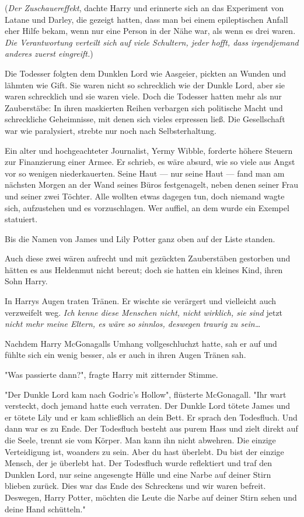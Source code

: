 {(\emph{Der Zuschauereffekt}, dachte Harry und erinnerte sich an das Experiment von Latane und Darley, die gezeigt hatten, dass man bei einem epileptischen Anfall eher Hilfe bekam, wenn nur eine Person in der Nähe war, als wenn es drei waren. \emph{Die Verantwortung verteilt sich auf viele Schultern, jeder hofft, dass irgendjemand anderes zuerst eingreift.})

Die Todesser folgten dem Dunklen Lord wie Aasgeier, pickten an Wunden und lähmten wie Gift. Sie waren nicht so schrecklich wie der Dunkle Lord, aber sie waren schrecklich und sie waren viele. Doch die Todesser hatten mehr als nur Zauberstäbe: In ihren maskierten Reihen verbargen sich politische Macht und schreckliche Geheimnisse, mit denen sich vieles erpressen ließ. Die Gesellschaft war wie paralysiert, strebte nur noch nach Selbsterhaltung.

Ein alter und hochgeachteter Journalist, Yermy Wibble, forderte höhere Steuern zur Finanzierung einer Armee. Er schrieb, es wäre absurd, wie so viele aus Angst vor so wenigen niederkauerten. Seine Haut --- nur seine Haut --- fand man am nächsten Morgen an der Wand seines Büros festgenagelt, neben denen seiner Frau und seiner zwei Töchter. Alle wollten etwas dagegen tun, doch niemand wagte sich, aufzustehen und es vorzuschlagen. Wer auffiel, an dem wurde ein Exempel statuiert.

Bis die Namen von James und Lily Potter ganz oben auf der Liste standen.

Auch diese zwei wären aufrecht und mit gezückten Zauberstäben gestorben und hätten es aus Heldenmut nicht bereut; doch sie hatten ein kleines Kind, ihren Sohn Harry.

In Harrys Augen traten Tränen. Er wischte sie verärgert und vielleicht auch verzweifelt weg. \emph{Ich kenne diese Menschen nicht, nicht wirklich, sie sind} jetzt \emph{nicht mehr meine Eltern, es wäre so sinnlos, deswegen traurig zu sein…}

Nachdem Harry McGonagalls Umhang vollgeschluchzt hatte, sah er auf und fühlte sich ein wenig besser, als er auch in ihren Augen Tränen sah.

"Was passierte dann?", fragte Harry mit zitternder Stimme.

"Der Dunkle Lord kam nach Godric's Hollow", flüsterte McGonagall. "Ihr wart versteckt, doch jemand hatte euch verraten. Der Dunkle Lord tötete James und er tötete Lily und er kam schließlich an dein Bett. Er sprach den Todesfluch. Und dann war es zu Ende. Der Todesfluch besteht aus purem Hass und zielt direkt auf die Seele, trennt sie vom Körper. Man kann ihn nicht abwehren. Die einzige Verteidigung ist, woanders zu sein. Aber du hast überlebt. Du bist der einzige Mensch, der je überlebt hat. Der Todesfluch wurde reflektiert und traf den Dunklen Lord, nur seine angesengte Hülle und eine Narbe auf deiner Stirn blieben zurück. Dies war das Ende des Schreckens und wir waren befreit. Deswegen, Harry Potter, möchten die Leute die Narbe auf deiner Stirn sehen und deine Hand schütteln."

}

